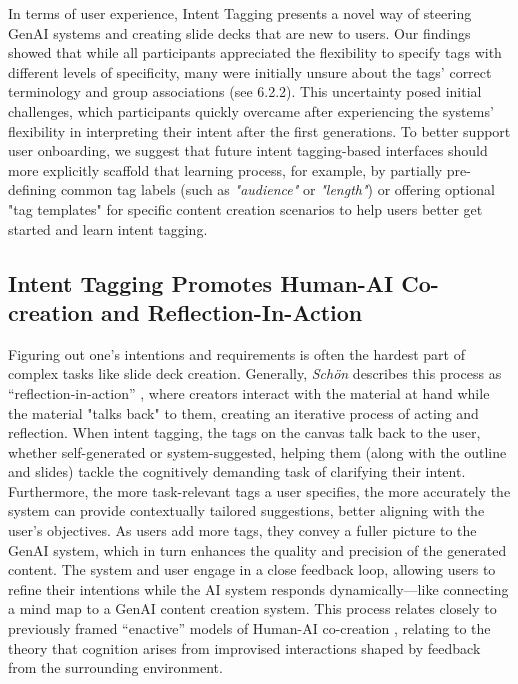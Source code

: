 In terms of user experience, Intent Tagging presents a novel way of steering GenAI systems and creating slide decks that are new to users. 
Our findings showed that while all participants appreciated the flexibility to specify tags with different levels of specificity, many were initially unsure about the tags' correct terminology and group associations (see 6.2.2).
This uncertainty posed initial challenges, which participants quickly overcame after experiencing the systems' flexibility in interpreting their intent after the first generations. 
To better support user onboarding, we suggest that future intent tagging-based interfaces should more explicitly scaffold that learning process, for example, by partially pre-defining common tag labels (such as \textit{"audience"} or \textit{"length"}) or offering optional "tag templates" for specific content creation scenarios to help users better get started and learn intent tagging.   






\subsection{Intent Tagging Promotes Human-AI Co-creation and Reflection-In-Action }

Figuring out one's intentions and requirements is often the hardest part of complex tasks like slide deck creation. 
Generally, \textit{Schön} describes this process as “reflection-in-action” \cite{schon_reflective_1983}, where creators interact with the material at hand while the material "talks back" to them, creating an iterative process of acting and reflection. 
When intent tagging, the tags on the canvas talk back to the user, whether self-generated or system-suggested, helping them (along with the outline and slides) tackle the cognitively demanding task of clarifying their intent. 
Furthermore, the more task-relevant tags a user specifies, the more accurately the system can provide contextually tailored suggestions, better aligning with the user’s objectives. 
As users add more tags, they convey a fuller picture to the GenAI system, which in turn enhances the quality and precision of the generated content. 
The system and user engage in a close feedback loop, allowing users to refine their intentions while the AI system responds dynamically---like connecting a mind map to a GenAI content creation system. 
This process relates closely to previously framed ``enactive'' models of Human-AI co-creation \cite{davis_enactive_2015}, relating to the theory that cognition arises from improvised interactions shaped by feedback from the surrounding environment.

